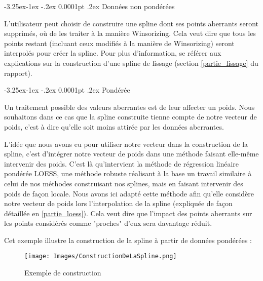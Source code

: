 \documentclass[a4paper,12pt]{article} %
\makeatletter
\renewcommand\paragraph{\@startsection{paragraph}{4}{\z@}%
                                      {-3.25ex\@plus -1ex \@minus -.2ex}%
                                      {0.0001pt \@plus .2ex}%
                                      {\normalfont\normalsize\bfseries}}
\makeatother
\begin{document}
			        \paragraph{Données non pondérées}
			        
    			        L'utilisateur peut choisir de construire une spline dont ses points aberrants seront supprimés, où de les traiter à la manière Winsorizing. Cela veut dire que tous les points restant (incluant ceux modifiés à la manière de Winsorizing) seront interpolés pour créer la spline. Pour plus d'information, se référer aux explications sur la construction d'une spline de lissage (section \ref{partie_lissage} du rapport).
    			        
			        \paragraph{Pondérée}
			        
    			        Un traitement possible des valeurs aberrantes est de leur affecter un poids. Nous souhaitons dans ce cas que la spline construite tienne compte de notre vecteur de poids, c'est à dire qu'elle soit moins attirée par les données aberrantes.
                        
                        L'idée que nous avons eu pour utiliser notre vecteur dans la construction de la spline, c'est d'intégrer notre vecteur de poids dans une méthode faisant elle-même intervenir des poids. C'est là qu'intervient la méthode de régression linéaire pondérée LOESS, une méthode robuste réalisant à la base un travail similaire à celui de nos méthodes construisant nos splines, mais en faisant intervenir des poids de façon locale.  Nous avons ici adapté cette méthode afin qu'elle considère notre vecteur de poids lors l'interpolation de la spline (expliquée de façon détaillée en \ref{partie_loess}). Cela veut dire que l'impact des points aberrants sur les points considérés comme "proches" d'eux sera davantage réduit.
					   
					    Cet exemple illustre la construction de la spline à partir de données pondérées :
					   
    			        \begin{figure}[H]
                            \centering
                            \texttt{[image: Images/ConstructionDeLaSpline.png]}
                            \caption{Exemple de construction}
                            \label{fig:exemple}
                        \end{figure}
                        
\end{document}
